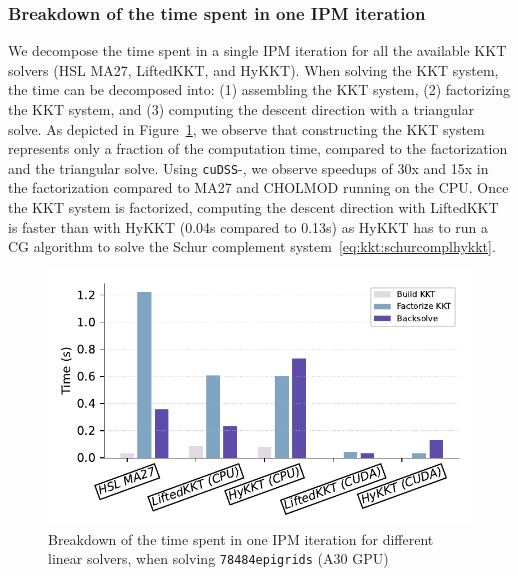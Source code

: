 \subsubsection{Breakdown of the time spent in one IPM iteration}
We decompose the time spent in a single
IPM iteration for all the available KKT solvers (HSL MA27, LiftedKKT, and HyKKT).
When solving the KKT system, the time can be decomposed into: (1) assembling the
KKT system, (2) factorizing the KKT system, and (3) computing the descent direction with a triangular solve.
As depicted in Figure~\ref{fig:timebreakdown}, we observe
that constructing the KKT system represents only a fraction of the computation time, compared
to the factorization and the triangular solve. Using {\tt cuDSS}-\ldlt, we observe speedups of
30x and 15x in the factorization compared to MA27 and CHOLMOD running on the CPU.
Once the KKT system is factorized, computing the descent direction with LiftedKKT is faster than with HyKKT
(0.04s compared to 0.13s) as HyKKT has to run a CG algorithm to solve the Schur complement
system~\eqref{eq:kkt:schurcomplhykkt}.

\begin{figure}[!ht]
  \centering
  \includegraphics[width=.7\textwidth]{../figures/breakdown.pdf}
  \caption{Breakdown of the time spent in one IPM iteration
    for different linear solvers, when solving {\tt 78484epigrids} (A30 GPU)
  \label{fig:timebreakdown}}
\end{figure}



